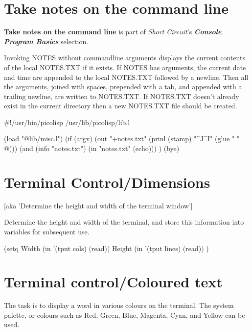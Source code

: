 \pagebreak{}
\section*{Take notes on the command line}


\textbf{Take notes on the command line} is part of \emph{Short
  Circuit}'s \textbf{\emph{Console Program Basics}} selection.

Invoking NOTES without commandline arguments displays the current
contents of the local NOTES.TXT if it exists. If NOTES has arguments,
the current date and time are appended to the local NOTES.TXT followed
by a newline. Then all the arguments, joined with spaces, prepended with
a tab, and appended with a trailing newline, are written to NOTES.TXT.
If NOTES.TXT doesn't already exist in the current directory then a new
NOTES.TXT file should be created.


\begin{wideverbatim}

#!/usr/bin/picolisp /usr/lib/picolisp/lib.l

(load "@lib/misc.l")
(if (argv)
   (out "+notes.txt" (prinl (stamp) "^J^I" (glue " " @)))
   (and (info "notes.txt") (in "notes.txt" (echo))) )
(bye)

\end{wideverbatim}

\pagebreak{}
\section*{Terminal Control/Dimensions}

[aka 'Determine the height and width of the
terminal window']

Determine the height and width of the terminal, and store this
information into variables for subsequent use.

\begin{wideverbatim}

(setq
   Width (in '(tput cols) (read))
   Height (in '(tput lines) (read)) )

\end{wideverbatim}

\pagebreak{}
\section*{Terminal control/Coloured text}

The task is to display a word in various colours on the terminal. The
system palette, or colours such as Red, Green, Blue, Magenta, Cyan, and
Yellow can be used.


